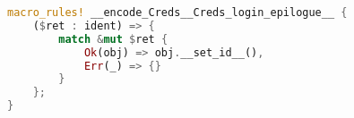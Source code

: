 \begin{minipage}{\linewidth}
\begin{lstlisting}[language=rust,caption={Return value inspecting macro.},label={lst:retvalinsp}]
macro_rules! __encode_Creds__Creds_login_epilogue__ {
    ($ret : ident) => {
        match &mut $ret {
            Ok(obj) => obj.__set_id__(),
            Err(_) => {}
        }
    };
}
\end{lstlisting}
\end{minipage}

